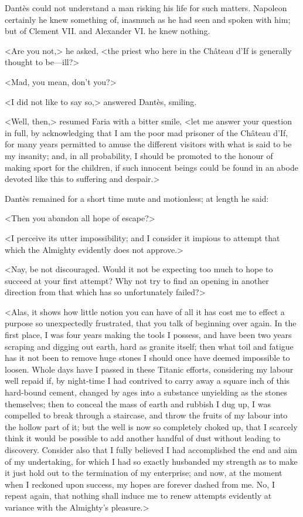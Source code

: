  Dantès could not understand a man risking his life for such matters. Napoleon certainly he knew something of, inasmuch as he had seen and spoken with him; but of Clement VII. and Alexander VI. he knew nothing. 

 <Are you not,> he asked, <the priest who here in the Château d'If is generally thought to be—ill?> 

 <Mad, you mean, don't you?> 

 <I did not like to say so,> answered Dantès, smiling. 

 <Well, then,> resumed Faria with a bitter smile, <let me answer your question in full, by acknowledging that I am the poor mad prisoner of the Château d'If, for many years permitted to amuse the different visitors with what is said to be my insanity; and, in all probability, I should be promoted to the honour of making sport for the children, if such innocent beings could be found in an abode devoted like this to suffering and despair.> 

 Dantès remained for a short time mute and motionless; at length he said: 

 <Then you abandon all hope of escape?> 

 <I perceive its utter impossibility; and I consider it impious to attempt that which the Almighty evidently does not approve.> 

 <Nay, be not discouraged. Would it not be expecting too much to hope to succeed at your first attempt? Why not try to find an opening in another direction from that which has so unfortunately failed?> 

 <Alas, it shows how little notion you can have of all it has cost me to effect a purpose so unexpectedly frustrated, that you talk of beginning over again. In the first place, I was four years making the tools I possess, and have been two years scraping and digging out earth, hard as granite itself; then what toil and fatigue has it not been to remove huge stones I should once have deemed impossible to loosen. Whole days have I passed in these Titanic efforts, considering my labour well repaid if, by night-time I had contrived to carry away a square inch of this hard-bound cement, changed by ages into a substance unyielding as the stones themselves; then to conceal the mass of earth and rubbish I dug up, I was compelled to break through a staircase, and throw the fruits of my labour into the hollow part of it; but the well is now so completely choked up, that I scarcely think it would be possible to add another handful of dust without leading to discovery. Consider also that I fully believed I had accomplished the end and aim of my undertaking, for which I had so exactly husbanded my strength as to make it just hold out to the termination of my enterprise; and now, at the moment when I reckoned upon success, my hopes are forever dashed from me. No, I repeat again, that nothing shall induce me to renew attempts evidently at variance with the Almighty's pleasure.> 

